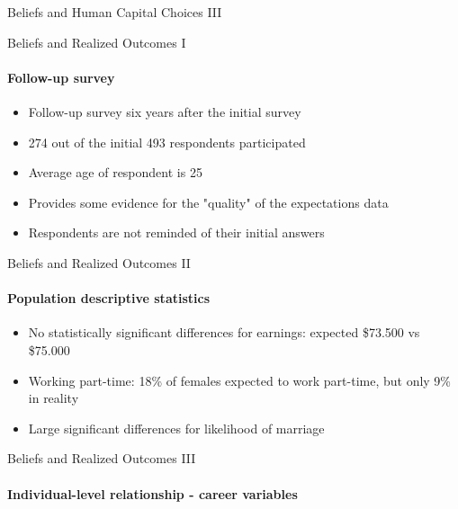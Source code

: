 \documentclass[12pt]{beamer}
\begin{document}
\begin{frame}{Beliefs and Human Capital Choices III}
    \begin{center}
    \end{center}
\end{frame}

\begin{frame}{Beliefs and Realized Outcomes I}
    \framesubtitle{Follow-up survey}
    \begin{itemize}
        \item Follow-up survey six years after the initial survey
        \item 274 out of the initial 493 respondents participated
        \item Average age of respondent is 25
        \item Provides some evidence for the "quality" of the expectations data
        \item Respondents are not reminded of their initial answers
    \end{itemize}
    
\end{frame}

\begin{frame}{Beliefs and Realized Outcomes II}
    \framesubtitle{Population descriptive statistics}
    \begin{itemize}
        \item No statistically significant differences for earnings: expected \$73.500 vs \$75.000
        \item Working part-time: 18\% of females expected to work part-time, but only 9\% in reality
        \item Large significant differences for likelihood of marriage
    \end{itemize}
\end{frame}

\begin{frame}{Beliefs and Realized Outcomes III}
    \framesubtitle{Individual-level relationship - career variables}
    \begin{center}
    \end{center}
\end{frame}
\end{document}
